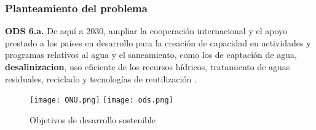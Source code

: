 \begin{frame}
    \frametitle{Planteamiento del problema}
    \begin{displayquote}
        \justifying
        \textbf{ODS 6.a.} De aquí a 2030, ampliar la cooperación internacional y el apoyo prestado a los países en desarrollo para la creación de capacidad en actividades y programas relativos al agua y el saneamiento, como los de captación de agua, \textbf{\gls{desalinizacion}}, uso eficiente de los recursos hídricos, tratamiento de aguas residuales, reciclado y tecnologías de reutilización \cite{naciones_unidas_sustainable_nodate}.
    \end{displayquote}\vspace*{6mm}
    \centering
    \begin{figure}
        \centering
        \texttt{[image: ONU.png]}
        \texttt{[image: ods.png]}
        \caption{Objetivos de desarrollo sostenible}
    \end{figure}
    
\end{frame}